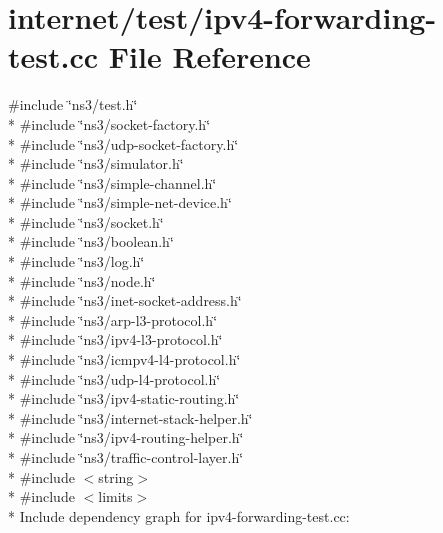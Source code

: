 \hypertarget{ipv4-forwarding-test_8cc}{}\section{internet/test/ipv4-\/forwarding-\/test.cc File Reference}
\label{ipv4-forwarding-test_8cc}
{\ttfamily \#include \char`\"{}ns3/test.\+h\char`\"{}}\\*
{\ttfamily \#include \char`\"{}ns3/socket-\/factory.\+h\char`\"{}}\\*
{\ttfamily \#include \char`\"{}ns3/udp-\/socket-\/factory.\+h\char`\"{}}\\*
{\ttfamily \#include \char`\"{}ns3/simulator.\+h\char`\"{}}\\*
{\ttfamily \#include \char`\"{}ns3/simple-\/channel.\+h\char`\"{}}\\*
{\ttfamily \#include \char`\"{}ns3/simple-\/net-\/device.\+h\char`\"{}}\\*
{\ttfamily \#include \char`\"{}ns3/socket.\+h\char`\"{}}\\*
{\ttfamily \#include \char`\"{}ns3/boolean.\+h\char`\"{}}\\*
{\ttfamily \#include \char`\"{}ns3/log.\+h\char`\"{}}\\*
{\ttfamily \#include \char`\"{}ns3/node.\+h\char`\"{}}\\*
{\ttfamily \#include \char`\"{}ns3/inet-\/socket-\/address.\+h\char`\"{}}\\*
{\ttfamily \#include \char`\"{}ns3/arp-\/l3-\/protocol.\+h\char`\"{}}\\*
{\ttfamily \#include \char`\"{}ns3/ipv4-\/l3-\/protocol.\+h\char`\"{}}\\*
{\ttfamily \#include \char`\"{}ns3/icmpv4-\/l4-\/protocol.\+h\char`\"{}}\\*
{\ttfamily \#include \char`\"{}ns3/udp-\/l4-\/protocol.\+h\char`\"{}}\\*
{\ttfamily \#include \char`\"{}ns3/ipv4-\/static-\/routing.\+h\char`\"{}}\\*
{\ttfamily \#include \char`\"{}ns3/internet-\/stack-\/helper.\+h\char`\"{}}\\*
{\ttfamily \#include \char`\"{}ns3/ipv4-\/routing-\/helper.\+h\char`\"{}}\\*
{\ttfamily \#include \char`\"{}ns3/traffic-\/control-\/layer.\+h\char`\"{}}\\*
{\ttfamily \#include $<$string$>$}\\*
{\ttfamily \#include $<$limits$>$}\\*
Include dependency graph for ipv4-\/forwarding-\/test.cc\+:
